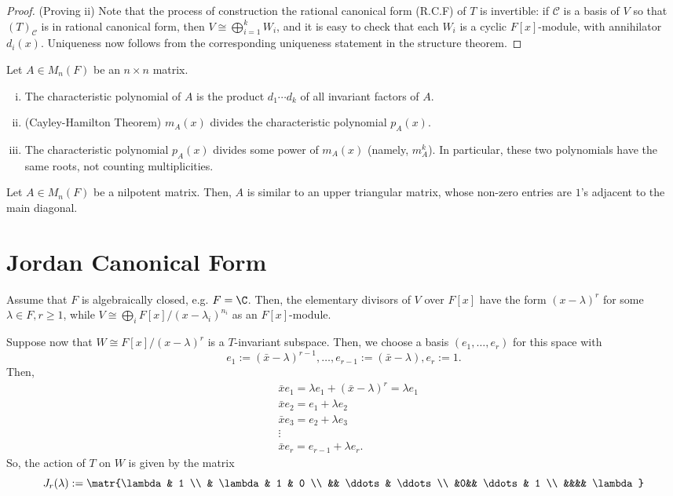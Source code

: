 \begin{proof}
    (Proving ii) Note that the process of construction the rational canonical form (R.C.F) of $T$ is invertible: if $\mathcal C$ is a basis of $V$ so that $(T)_{\mathcal C}$ is in rational canonical form, then $V \cong \bigoplus_{i=1}^k W_i$, and it is easy to check that each $W_i$ is a cyclic $F[x]$-module, with annihilator $d_{i}(x)$. Uniqueness now follows from the corresponding uniqueness statement in the structure theorem.
\end{proof}

\begin{cor}
    Let $A \in M_n(F)$ be an  $n \times n$ matrix.
    \begin{enumerate}[(i)]
        \item The characteristic polynomial of $A$ is the product $d_1\cdots d_k$ of all invariant factors of $A$.
        \item (Cayley-Hamilton Theorem) $m_A(x)$ divides the characteristic polynomial $p_A(x)$.
        \item The characteristic polynomial $p_A(x)$ divides some power of $m_A(x)$ (namely, $m_A^k$). In particular, these two polynomials have the same roots, not counting multiplicities.
    \end{enumerate}
\end{cor}

\begin{cor}
    Let $A \in M_n(F)$ be a nilpotent matrix. Then, $A$ is similar to an upper triangular matrix, whose non-zero entries are $1$'s adjacent to the main diagonal.
\end{cor}

\section{Jordan Canonical Form}

Assume that $F$ is algebraically closed, e.g. $F=\C$. Then, the elementary divisors of $V$ over $F[x]$ have the form $(x-\lambda)^r$ for some $\lambda \in F,r \geq 1$, while $V \cong \bigoplus _{i}F[x]/(x-\lambda_i)^{n_i}$ as an $F[x]$-module.

Suppose now that $W \cong F[x]/(x-\lambda)^r$ is a $T$-invariant subspace. Then, we choose a basis $(e_1,\dots,e_r)$ for this space with
$$e_1:=(\bar x - \lambda)^{r-1},\dots, e_{r-1}:=(\bar x - \lambda), e_r := 1.$$
Then, \begin{align*}
   & \bar x e_1 = \lambda e_1 + (\bar x - \lambda ) ^r = \lambda e_1 \\
   & \bar x e_2 = e_1 + \lambda e_2 \\ &\bar x e_3 = e_2 + \lambda e_3 \\ & \vdots \\ & \bar x e_r = e_{r-1}+ \lambda e_r.
\end{align*}
So, the action of $T$ on $W$ is given by the matrix
$$J_r(\lambda) := \matr{\lambda & 1 \\ & \lambda & 1 & 0 \\ && \ddots  & \ddots \\ &0&& \ddots & 1 \\ &&&& \lambda}$$


